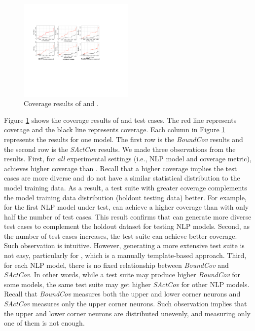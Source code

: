 
\begin{figure}
    \centering
    \includegraphics[width=0.5\textwidth]{figs/nlp_coverage.pdf}
    \vspace{-6mm}
    \caption{Coverage results of \tool and \Cklst.}
    \label{fig:coverage}
\end{figure}

Figure \ref{fig:coverage} shows the coverage results of \tool and \Cklst test cases. The red line represents \tool coverage and the black line represents \Cklst coverage. Each column in Figure \ref{fig:coverage} represents the results for one \sa model. The first row is the \textit{BoundCov} results and the second row is the \textit{SActCov} results.
We made three observations from the results.
First, for \emph{all} experimental settings (i.e., NLP model and coverage metric), \tool achieves higher coverage than \Cklst. Recall that a higher coverage implies the test cases are more diverse and do not have a similar statistical distribution to the model training data. As a result, a test suite with greater coverage complements the model training data distribution (\ie holdout testing data) better.
For example, for the first NLP model under test, \tool can achieve a higher coverage than \Cklst with only half the number of test cases.
This result confirms that \tool can generate more diverse test cases to complement the holdout dataset for testing NLP models.
Second, as the number of test cases increases, the test suite can achieve better coverage. Such observation is intuitive. However, generating a more extensive test suite is not easy, particularly  for \Cklst, which is a manually template-based approach.
Third, for each NLP model, there is no fixed relationship between \textit{BoundCov} and \textit{SActCov}. In other words, while a test suite may produce higher \textit{BoundCov} for some models, the same test suite may get higher \textit{SActCov} for other NLP models.
Recall that \textit{BoundCov} measures both the upper and lower corner neurons and \textit{SActCov} measures only the upper corner neurons. 
Such observation implies that the upper and lower corner neurons are distributed unevenly, and measuring only one of them is not enough.